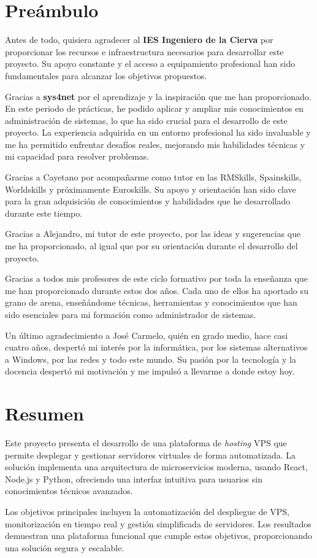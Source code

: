 \documentclass[11pt,oneside,a4paper]{book}
\newcommand{\newchapter}[1]{{\section*{#1}
\addcontentsline{toc}{chapter}{#1}}}
\newcommand{\blankpage}{
  \clearpage
  \begingroup
  \pagestyle{empty}
  \null
  \vfill
  \newpage
  \addtocounter{page}{-1} %
  \endgroup
}
\begin{document}
\newpage

\newchapter{Preámbulo}
Antes de todo, quisiera agradecer al \textbf{IES Ingeniero de la Cierva} por proporcionar los recursos e infraestructura necesarios para desarrollar este proyecto. Su apoyo constante y el acceso a equipamiento profesional han sido fundamentales para alcanzar los objetivos propuestos.

Gracias a \textbf{sys4net} por el aprendizaje y la inspiración que me han proporcionado. En este periodo de prácticas, he podido aplicar y ampliar mis conocimientos en administración de sistemas, lo que ha sido crucial para el desarrollo de este proyecto. La experiencia adquirida en un entorno profesional ha sido invaluable y me ha permitido enfrentar desafíos reales, mejorando mis habilidades técnicas y mi capacidad para resolver problemas.

Gracias a Cayetano por acompañarme como tutor en las RMSkills, Spainskills, Worldskills y próximamente Euroskills. Su apoyo y orientación han sido clave para la gran adquisición de conocimientos y habilidades que he desarrollado durante este tiempo.

Gracias a Alejandro, mi tutor de este proyecto, por las ideas y sugerencias que me ha proporcionado, al igual que por su orientación durante el desarrollo del proyecto.

Gracias a todos mis profesores de este ciclo formativo por toda la enseñanza que me han proporcionado durante estos dos años. Cada uno de ellos ha aportado su grano de arena, enseñándome técnicas, herramientas y conocimientos que han sido esenciales para mi formación como administrador de sistemas.

Un último agradecimiento a José Carmelo, quién en grado medio, hace casi cuatro años, despertó mi interés por la informática, por los sistemas alternativos a Windows, por las redes y todo este mundo. Su pasión por la tecnología y la docencia despertó mi motivación y me impulsó a llevarme a donde estoy hoy.

\blankpage

\newchapter{Resumen}
Este proyecto presenta el desarrollo de una plataforma de \textit{hosting} VPS que permite desplegar y gestionar servidores virtuales de forma automatizada. La solución implementa una arquitectura de microservicios moderna, usando React, Node.js y Python, ofreciendo una interfaz intuitiva para usuarios sin conocimientos técnicos avanzados.

Los objetivos principales incluyen la automatización del despliegue de VPS, monitorización en tiempo real y gestión simplificada de servidores. Los resultados demuestran una plataforma funcional que cumple estos objetivos, proporcionando una solución segura y escalable.
\end{document}

